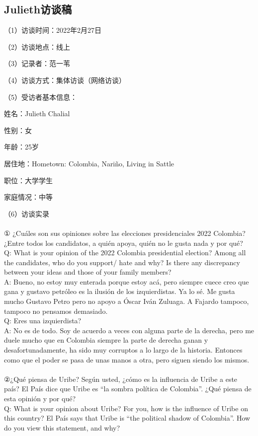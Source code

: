 \documentclass{phyasgn}\usepackage{nag}
\begin{document}
\subsection{Julieth访谈稿}
\par （1）访谈时间：2022年2月27日
\par （2）访谈地点：线上
\par （3）记录者：范一苇
\par （4）访谈方式：集体访谈（网络访谈）
\par （5）受访者基本信息：
 \par  姓名：Julieth Chalial
\par 性别：女
\par 年龄：25岁
\par 居住地：Hometown: Colombia, Nariño, Living in Sattle
\par 职位：大学学生
\par 家庭情况：中等
\par （6）访谈实录\\
\\
① ¿Cuáles son sus opiniones sobre las elecciones presidenciales 2022 Colombia? ¿Entre todos los candidatos, a quién apoya, quién no le gusta nada y por qué?\\
	Q: What is your opinion of the 2022 Colombia presidential election? Among all the candidates, who do you support/ hate and why? Is there any discrepancy between your ideas and those of your family members?\\
A: Bueno, no estoy muy enterada porque estoy acá, pero siempre cuece creo que gana y gustavo petróleo es la ilusión de los izquierdistas. Ya lo sé.
Me gusta mucho Gustavo Petro pero no apoyo a Óscar Iván Zuluaga. A Fajardo tampoco, tampoco no pensamos demasiado.\\
Q: Eres una izquierdista?\\
A: No es de todo. Soy de acuerdo a veces con alguna parte de la derecha, pero me duele mucho que en Colombia siempre la parte de derecha ganan y desafortunadamente, ha sido muy corruptos a lo largo de la historia. Entonces como que el poder se pasa de unas manos a otra, pero siguen siendo los mismos.\\
\\
②¿Qué piensa de Uribe? Según usted, ¿cómo es la influencia de Uribe a este país? El País dice que Uribe es “la sombra política de Colombia”. ¿Qué piensa de esta opinión y por qué?\\
Q: What is your opinion about Uribe? For you, how is the influence of Uribe on this country? El País says that Uribe is “the political shadow of Colombia”. How do you view this statement, and why?\\
\end{document}
